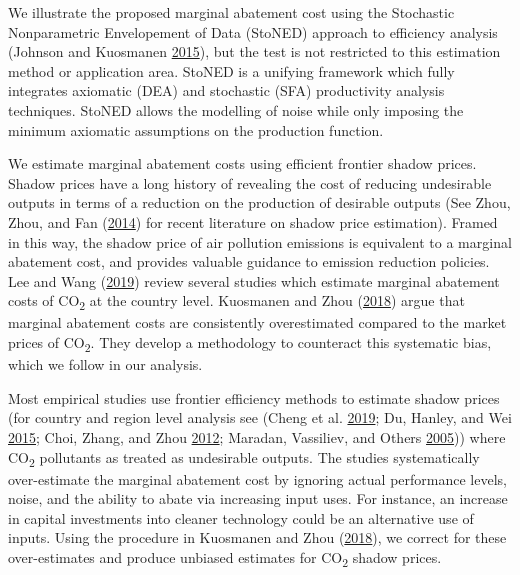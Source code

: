 \documentclass[12pt,]{article}
\begin{document}
We illustrate the proposed marginal abatement cost using the Stochastic Nonparametric Envelopement of Data (StoNED) approach to efficiency analysis (Johnson and Kuosmanen \protect\hyperlink{ref-Johnson2015}{2015}), but the test is not restricted to this estimation method or application area. StoNED is a unifying framework which fully integrates axiomatic (DEA) and stochastic (SFA) productivity analysis techniques. StoNED allows the modelling of noise while only imposing the minimum axiomatic assumptions on the production function.

We estimate marginal abatement costs using efficient frontier shadow prices. Shadow prices have a long history of revealing the cost of reducing undesirable outputs in terms of a reduction on the production of desirable outputs (See Zhou, Zhou, and Fan (\protect\hyperlink{ref-Zhou2014}{2014}) for recent literature on shadow price estimation). Framed in this way, the shadow price of air pollution emissions is equivalent to a marginal abatement cost, and provides valuable guidance to emission reduction policies. Lee and Wang (\protect\hyperlink{ref-Lee2019}{2019}) review several studies which estimate marginal abatement costs of CO\textsubscript{2} at the country level. Kuosmanen and Zhou (\protect\hyperlink{ref-Kuosmanen2018b}{2018}) argue that marginal abatement costs are consistently overestimated compared to the market prices of CO\textsubscript{2}. They develop a methodology to counteract this systematic bias, which we follow in our analysis.

Most empirical studies use frontier efficiency methods to estimate shadow prices (for country and region level analysis see (Cheng et al. \protect\hyperlink{ref-Cheng2019}{2019}; Du, Hanley, and Wei \protect\hyperlink{ref-Du2015}{2015}; Choi, Zhang, and Zhou \protect\hyperlink{ref-Choi2012}{2012}; Maradan, Vassiliev, and Others \protect\hyperlink{ref-Maradan2005}{2005})) where CO\textsubscript{2} pollutants as treated as undesirable outputs. The studies systematically over-estimate the marginal abatement cost by ignoring actual performance levels, noise, and the ability to abate via increasing input uses. For instance, an increase in capital investments into cleaner technology could be an alternative use of inputs. Using the procedure in Kuosmanen and Zhou (\protect\hyperlink{ref-Kuosmanen2018b}{2018}), we correct for these over-estimates and produce unbiased estimates for CO\textsubscript{2} shadow prices.
\end{document}
